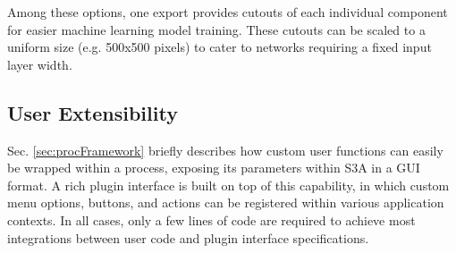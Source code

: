 Among these options, one export provides cutouts of each individual component for easier machine learning model training. These cutouts can be scaled to a uniform size (e.g. 500x500 pixels) to cater to networks requiring a fixed input layer width.

\subsection{User Extensibility}
Sec. \ref{sec:procFramework} briefly describes how custom user functions can easily be wrapped within a process, exposing its parameters within S3A in a GUI format. A rich plugin interface is built on top of this capability, in which custom menu options, buttons, and actions can be registered within various application contexts. In all cases, only a few lines of code are required to achieve most integrations between user code and plugin interface specifications.